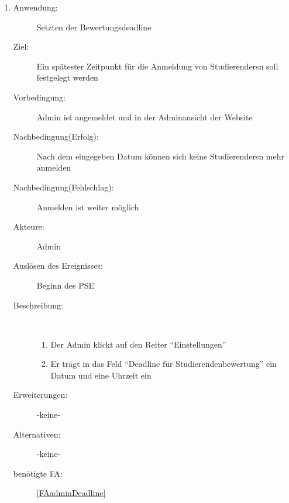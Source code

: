 \documentclass[parskip=full]{scrartcl}
\newcommand{\swtLabel}[1]{\textbf{/#1\arabic*0/}}
\begin{document}
\begin{enumerate} [label=\swtLabel{A}]
	\item \label{UCadminDeadline}
	\begin{description}
		\item[Anwendung:] Setzten der Bewertungsdeadline
		\item[Ziel:] Ein spätester Zeitpunkt für die Anmeldung von \glspl{Studierender}n soll festgelegt werden
		\item[Vorbedingung:] \gls{Admin} ist angemeldet und in der Adminansicht der Website
		\item[Nachbedingung(Erfolg):] Nach dem eingegeben Datum können sich keine
		\glspl{Studierender}n mehr anmelden
		\item[Nachbedingung(Fehlschlag):] Anmelden ist weiter möglich
		\item[Akteure:] \gls{Admin}
		\item[Auslösen des Ereignisses:] Beginn des \gls{PSE}
		\item[Beschreibung:]~
		\begin{enumerate}[label=\arabic*.]
			\item Der \gls{Admin} klickt auf den Reiter \enquote{Einstellungen}
			\item Er trägt in das Feld \enquote{Deadline für Studierendenbewertung} ein Datum und eine Uhrzeit ein
		\end{enumerate}
		\item[Erweiterungen:] -keine-
		\item[Alternativen:] -keine-
		\item[benötigte FA:] \ref{FAadminDeadline}
	\end{description}
	

\end{enumerate}
\end{document}
